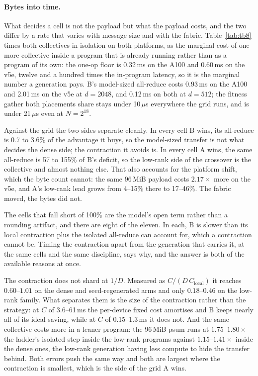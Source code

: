 \paragraph{Bytes into time.} What decides a cell is not the payload but what
the payload costs, and the two differ by a rate that varies with message size
and with the fabric. Table~\ref{tab:tb8} times both collectives in isolation
on both platforms, as the marginal cost of one more collective inside a
program that is already running rather than as a program of its own: the
one-op floor is 0.32\,ms on the A100 and 0.60\,ms on the v5e, twelve and a
hundred times the in-program latency, so it is the marginal number a
generation pays. B's model-sized all-reduce costs 0.93\,ms on the A100 and
2.01\,ms on the v5e at $d{=}2048$, and 0.12\,ms on both at $d{=}512$; the
fitness gather both placements share stays under 10\,$\mu$s everywhere the
grid runs, and is under 21\,$\mu$s even at $N{=}2^{18}$.

Against the grid the two sides separate cleanly. In every cell B wins, its
all-reduce is 0.7 to 3.6\% of the advantage it buys, so the model-sized
transfer is not what decides the dense side; the contraction it avoids is.
In every cell A wins, the same all-reduce is 57 to 155\% of B's deficit, so
the low-rank side of the crossover is the collective and almost nothing else.
That also accounts for the platform shift, which the byte count cannot: the
same 96\,MiB payload costs $2.17\times$ more on the v5e, and A's low-rank
lead grows from 4--15\% there to 17--46\%. The fabric moved, the bytes did
not.

The cells that fall short of 100\% are the model's open term rather than a
rounding artifact, and there are eight of the eleven. In each, B is slower
than its local contraction plus the isolated all-reduce can account for,
which a contraction cannot be. Timing the contraction apart from the
generation that carries it, at the same cells and the same discipline, says
why, and the answer is both of the available reasons at once.

The contraction does not shard at $1/D$. Measured as
$C/(D\,C_{\mathrm{local}})$ it reaches $0.60$--$1.01$ on the dense and
seed-regenerated arms and only $0.18$--$0.46$ on the low-rank family. What
separates them is the size of the contraction rather than the strategy: at
$C$ of 3.6--61\,ms the per-device fixed cost amortises and B keeps nearly
all of its ideal saving, while at $C$ of 0.15--1.3\,ms it does not. And the
same collective costs more in a leaner program: the 96\,MiB psum runs at
$1.75$--$1.80\times$ the ladder's isolated step inside the low-rank programs
against $1.15$--$1.41\times$ inside the dense ones, the low-rank generation
having less compute to hide the transfer behind. Both errors push the same
way and both are largest where the contraction is smallest, which is the side
of the grid A wins.

